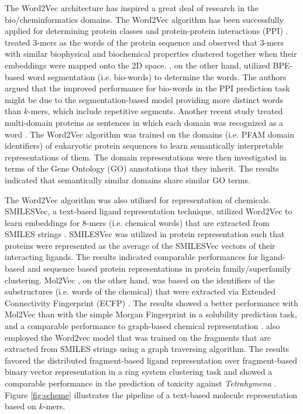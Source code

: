 \documentclass[review]{elsarticle}
\begin{document}
The Word2Vec architecture has inspired a great deal of research in the bio/cheminformatics domains. The Word2Vec algorithm has been successfully applied for determining protein classes \cite{asgari2015continuous} and  protein-protein interactions (PPI) \cite{wang2019high}.  \citet{asgari2015continuous} treated $3$-mers as the words of the protein sequence and observed that $3$-mers with similar  biophysical and biochemical properties clustered together when their embeddings were mapped onto the 2D space.  \citet{wang2019high}, on the other hand, utilized BPE-based word segmentation (i.e. bio-words) to determine the words. The authors argued that the improved performance for bio-words in the PPI prediction task might be due to the segmentation-based model providing more distinct words than $k$-mers, which include repetitive segments. Another recent study treated  multi-domain proteins as sentences in which each domain was recognized as a word \cite{buchan2019inferring}. The Word2Vec algorithm was trained on the domains (i.e. PFAM domain identifiers) of eukaryotic protein sequences to learn semantically interpretable representations of them. The domain representations were then investigated in terms of the Gene Ontology (GO) annotations that they inherit. The results indicated that semantically similar domains share similar GO terms. 

The Word2Vec algorithm was also utilized for representation of chemicals. SMILESVec, a text-based ligand representation technique, utilized Word2Vec to learn embeddings for $8$-mers (i.e. chemical words) that are extracted from SMILES strings \cite{ozturk2018novel}. SMILESVec was utilized in protein representation such that proteins were represented as the average of the SMILESVec vectors  of their interacting ligands. The results indicated comparable performances for ligand-based and sequence based protein representations in protein family/superfamily clustering. Mol2Vec \cite{jaeger2018mol2vec}, on the other hand, was based on the identifiers of the substructures (i.e. words of the chemical) that were extracted via Extended Connectivity Fingerprint (ECFP) \cite{rogers2010extended}. The results showed a better performance with Mol2Vec than with the simple Morgan Fingerprint in a solubility prediction task, and a comparable performance to graph-based chemical representation \cite{wu2018moleculenet}. \citet{chakravarti2018distributed} also employed the Word2vec model that was trained on the fragments that are extracted from SMILES strings using a graph traversing algorithm.  The results favored the distributed fragment-based ligand representation over fragment-based binary vector representation in a ring system clustering task and showed a comparable performance in the prediction of toxicity against \textit{Tetrahymena} \cite{chakravarti2018distributed}. Figure \ref{fig:scheme} illustrates the pipeline of a text-based molecule representation based on $k$-mers. 
\end{document}
